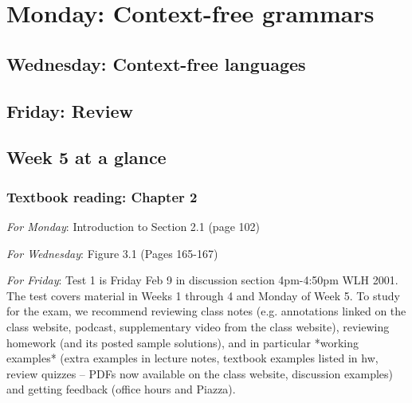 

\section*{Monday: Context-free grammars}


    
\newpage
\subsection*{Wednesday: Context-free languages}




\newpage
\subsection*{Friday: Review}



\newpage

\subsection*{Week 5 at a glance}

\subsubsection*{Textbook reading: Chapter 2}

{\it For Monday}: Introduction to Section 2.1 (page 102)

{\it For Wednesday}: Figure 3.1 (Pages 165-167)

{\it For Friday}: Test 1 is Friday Feb 9 in discussion section 4pm-4:50pm WLH 2001.  
The test covers material in Weeks 1 through 4 and Monday of Week 5.  To study for the exam, 
we recommend reviewing class notes (e.g. annotations linked on the class website, podcast, 
supplementary video from the class website), reviewing homework (and its posted sample solutions), 
and in particular *working examples* (extra examples in lecture notes, textbook examples listed in hw, 
review quizzes -- PDFs now available on the class website, discussion examples) and getting feedback (office hours and Piazza). 



